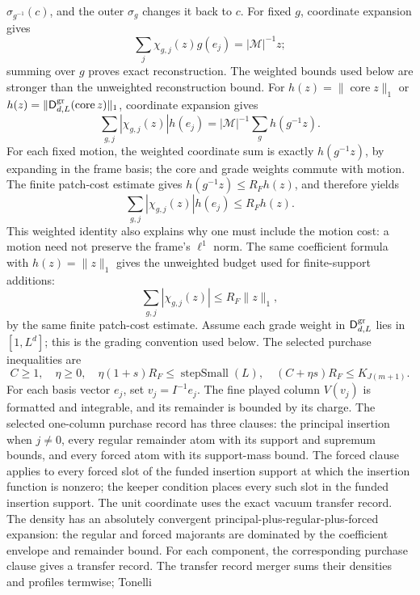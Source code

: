 $\sigma_{g^{-1}}(c)$, and the outer $\sigma_g$ changes it back to $c$.
For fixed $g$, coordinate expansion gives
\[
 \sum_j\chi_{g,j}(z)g(e_j)=|\mathcal M|^{-1}z;
\]
summing over $g$ proves exact reconstruction. The weighted bounds used
below are stronger than the unweighted reconstruction bound. For
$h(z)=\|\operatorname{core}z\|_1$ or
$h(z)=\|\mathsf D^{\rm gr}_{d,L}(\operatorname{core}z)\|_1$, coordinate
expansion gives
\[
 \sum_{g,j}|\chi_{g,j}(z)|h(e_j)
 =|\mathcal M|^{-1}\sum_g h(g^{-1}z).
\]
For each fixed motion, the weighted coordinate sum is exactly
$h(g^{-1}z)$, by expanding in the frame basis; the core and grade weights
commute with motion. The finite patch-cost estimate gives
$h(g^{-1}z)\le R_Fh(z)$, and therefore yields
\begin{equation}
 \sum_{g,j}|\chi_{g,j}(z)|h(e_j)\le R_Fh(z).
 \label{eq:ex-motion-weighted}
\end{equation}
This weighted identity also explains why one must include the motion cost:
a motion need not preserve the frame's $\ell^1$ norm.
The same coefficient formula with $h(z)=\|z\|_1$ gives the unweighted
budget used for finite-support additions:
\[
 \sum_{g,j}|\chi_{g,j}(z)|\le R_F\|z\|_1,
\]
by the same finite patch-cost estimate.
Assume each grade weight in $\mathsf D^{\rm gr}_{d,L}$ lies in $[1,L^d]$;
this is the grading convention used below. The selected purchase inequalities are
\begin{equation}
 C\ge1,\quad \eta\ge0,\quad
 \eta(1+s)R_F\le\operatorname{stepSmall}(L),\quad
 (C+\eta s)R_F\le K_{J(m+1)}.
 \label{eq:ex-interpolation-buy}
\end{equation}
For each basis vector $e_j$, set $v_j=I^{-1}e_j$. The fine played column
$V(v_j)$ is formatted and integrable, and its remainder is bounded by its
charge. The selected one-column purchase record has three clauses: the
principal insertion when $j\ne0$, every regular remainder atom with its
support and supremum bounds, and every forced atom with its support-mass
bound. The forced clause applies to every forced slot of the funded insertion support at
which the insertion function is nonzero; the keeper condition places every
such slot in the funded insertion support. The unit coordinate
uses the exact vacuum transfer record. The density has an absolutely convergent
principal-plus-regular-plus-forced expansion: the regular and forced
majorants are dominated by the coefficient envelope and remainder bound.
For each component, the corresponding purchase clause gives a transfer record. The
transfer record merger sums their densities and profiles termwise; Tonelli
